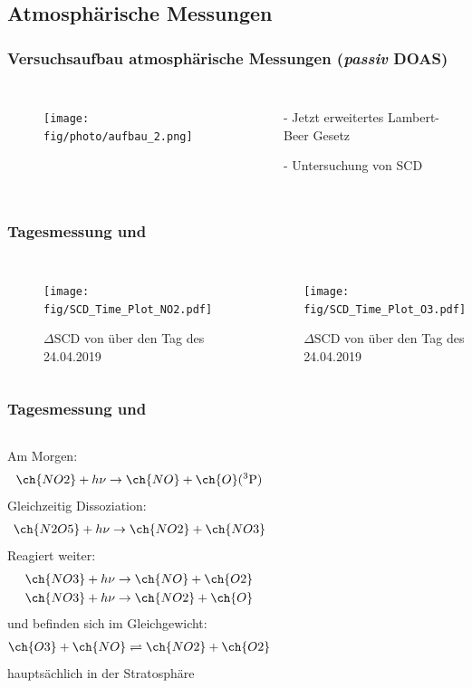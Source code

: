\documentclass{beamer}
\begin{document}
\begin{frame}
    \section{Atmosphärische Messungen}
    \frametitle{Versuchsaufbau atmosphärische Messungen (\textit{passiv} DOAS)}
     \begin{columns}
    		\begin{figure}[h]
    			\texttt{[image: fig/photo/aufbau\_2.png]}
    		\end{figure}
    		\begin{itemize}
    			\item[-] Jetzt erweitertes Lambert-Beer Gesetz
    			\item[-] Untersuchung von SCD
    		\end{itemize}
    \end{columns}
\end{frame}

\begin{frame}
    \frametitle{Tagesmessung  und }
	\begin{columns}
	  	\begin{figure}
	  		\texttt{[image: fig/SCD\_Time\_Plot\_NO2.pdf]}
    		\caption{$\Delta \text{SCD}$ von  über den Tag des 24.04.2019}
    		\label{fig:delta_SCD_time_NO2}
        \end{figure}
    	\begin{figure}
    		\texttt{[image: fig/SCD\_Time\_Plot\_O3.pdf]}
    		\caption{$\Delta \text{SCD}$ von  über den Tag des 24.04.2019}
    		\label{fig:delta_SCD_time_O3}
    	\end{figure}  		
    \end{columns}
\end{frame}

\begin{frame}
    \frametitle{Tagesmessung  und }
    \begin{columns}
    	Am Morgen:
    	\begin{align}
    		\ch{NO2} + h \nu \to \ch{NO} + \ch{O}(^3\text{P})
    	\end{align}
    \pause
    	Gleichzeitig Dissoziation:
    	\begin{align}
    		\ch{N2O5} + h \nu \to \ch{NO2} + \ch{NO3}
    	\end{align}
    \pause
    	Reagiert weiter:
    	\begin{align}
    		\ch{NO3} + h \nu \to \ch{NO} + \ch{O2}\\
    		\ch{NO3} + h \nu \to \ch{NO2} + \ch{O}
    	\end{align}
    \pause	
      	 und  befinden sich im Gleichgewicht:
      		\begin{align}
      			\ch{O3} + \ch{NO} \rightleftharpoons \ch{NO2} + \ch{O2}
      		\end{align}
      	 hauptsächlich in der Stratosphäre	
    \end{columns}
\end{frame}
\end{document}
